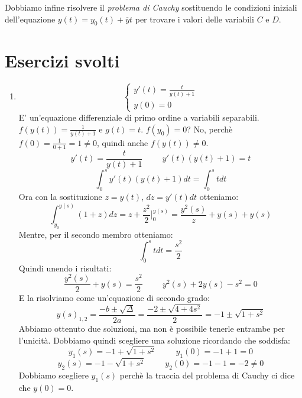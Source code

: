 Dobbiamo infine risolvere il \textit{problema di Cauchy} sostituendo le condizioni iniziali dell'equazione $y(t)=y_0(t)+\overline{y}t$ per trovare i valori delle variabili $C$ e $D$.



\chapter*{Esercizi svolti}
\begin{exercise}\phantom{}
\begin{enumerate}
    \item \begin{equation*}\begin{cases}y'(t)=\frac{t}{y(t)+1}\\y(0)=0\end{cases}\end{equation*}
    E' un'equazione differenziale di primo ordine a variabili separabili. $f(y(t))=\frac{1}{y(t)+1}$ e $g(t)=t$. $f(y_0)=0$? No, perchè $f(0)=\frac{1}{0+1}=1\neq0$, quindi anche $f(y(t))\neq0$.
    \begin{equation*}y'(t)=\frac{t}{y(t)+1}\hspace{1cm}y'(t)(y(t)+1)=t\end{equation*}
    \begin{equation*}\int^s_0y'(t)(y(t)+1)dt=\int^s_0tdt\end{equation*}
    Ora con la sostituzione $z=y(t)$, $dz=y'(t)dt$ otteniamo:
    \begin{equation*}\int^{y(s)}_{y_0}(1+z)dz=z+\frac{z^2}{2}]^{y(s)}_0=\frac{y^2(s)}{z}+y(s)+y(s)\end{equation*}
    Mentre, per il secondo membro otteniamo:
    \begin{equation*}\int^s_0tdt=\frac{s^2}{2}\end{equation*}
    Quindi unendo i risultati:
    \begin{equation*}\frac{y^2(s)}{2}+y(s)=\frac{s^2}{2}\hspace{1cm}y^2(s)+2y(s)-s^2=0\end{equation*}
    E la risolviamo come un'equazione di secondo grado:
    \begin{equation*}y(s)_{1,2}=\frac{-b\pm\sqrt{\Delta}}{2a}=\frac{-2\pm\sqrt{4+4s^2}}{2}=-1\pm\sqrt{1+s^2}\end{equation*}
    Abbiamo ottenuto due soluzioni, ma non è possibile tenerle entrambe per l'unicità. Dobbiamo quindi scegliere una soluzione ricordando che soddisfa:
    \begin{equation*}y_1(s)=-1+\sqrt{1+s^2}\hspace{1cm}y_1(0)=-1+1=0\end{equation*}
    \begin{equation*}y_2(s)=-1-\sqrt{1+s^2}\hspace{1cm}y_2(0)=-1-1=-2\neq0\end{equation*}
    Dobbiamo scegliere $y_1(s)$ perchè la traccia del problema di Cauchy ci dice che $y(0)=0$.
    

\end{enumerate}
\end{exercise}
